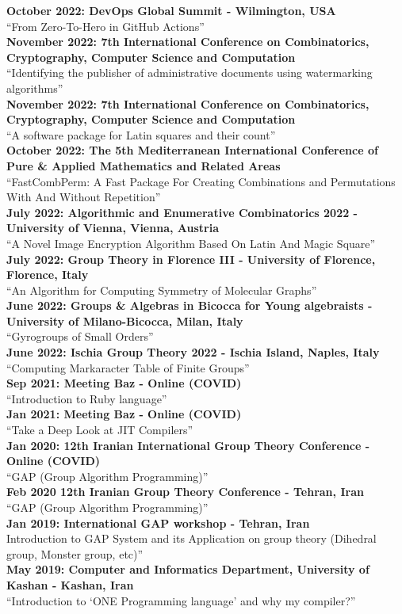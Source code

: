 \documentclass[a4paper,10pt]{article}
\begin{document}
\textbf{October 2022: DevOps Global Summit - Wilmington, USA}\\
“From Zero-To-Hero in GitHub Actions”\\
\textbf{November 2022: 7th International Conference on Combinatorics, Cryptography, Computer Science and Computation}\\
“Identifying the publisher of administrative documents using watermarking algorithms”\\
\textbf{November 2022: 7th International Conference on Combinatorics, Cryptography, Computer Science and Computation}\\
“A software package for Latin squares and their count”\\
\textbf{October 2022: The 5th Mediterranean International Conference of Pure \& Applied Mathematics and Related Areas}\\
“FastCombPerm: A Fast Package For Creating Combinations and Permutations With And Without Repetition”\\
\textbf{July 2022: Algorithmic and Enumerative Combinatorics 2022 - University of Vienna, Vienna, Austria}\\
“A Novel Image Encryption Algorithm Based On Latin And Magic Square”\\
\textbf{July 2022: Group Theory in Florence III - University of Florence, Florence, Italy}\\
“An Algorithm for Computing Symmetry of Molecular Graphs”\\
\textbf{June 2022: Groups \& Algebras in Bicocca for Young algebraists - University of Milano-Bicocca, Milan, Italy}\\
“Gyrogroups of Small Orders”\\
\textbf{June 2022: Ischia Group Theory 2022 - Ischia Island, Naples, Italy}\\
“Computing Markaracter Table of Finite Groups”\\
\textbf{Sep 2021: Meeting Baz - Online (COVID)}\\
“Introduction to Ruby language”\\
\textbf{Jan 2021: Meeting Baz - Online (COVID)}\\
“Take a Deep Look at JIT Compilers”\\
\textbf{Jan 2020: 12th Iranian International Group Theory Conference - Online (COVID)}\\
“GAP (Group Algorithm Programming)”\\
\textbf{Feb 2020 12th Iranian Group Theory Conference - Tehran, Iran}\\
“GAP (Group Algorithm Programming)”\\
\textbf{Jan 2019: International GAP workshop - Tehran, Iran}\\
Introduction to GAP System and its Application on group theory (Dihedral group, Monster group, etc)”\\
\textbf{May 2019: Computer and Informatics Department, University of Kashan - Kashan, Iran}\\
“Introduction to ‘ONE Programming language’ and why my compiler?”\\
\end{document}
